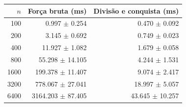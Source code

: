 \begin{tabular}{rrr}
\hline
$n$ & Força bruta (ms) & Divisão e conquista (ms) \\
\hline
100 & 0.997 $\pm$ 0.254 & 0.470 $\pm$ 0.092 \\
200 & 3.145 $\pm$ 0.692 & 0.749 $\pm$ 0.023 \\
400 & 11.927 $\pm$ 1.082 & 1.679 $\pm$ 0.058 \\
800 & 55.298 $\pm$ 14.105 & 4.244 $\pm$ 1.531 \\
1600 & 199.378 $\pm$ 11.407 & 9.074 $\pm$ 2.417 \\
3200 & 778.067 $\pm$ 27.041 & 18.997 $\pm$ 5.057 \\
6400 & 3164.203 $\pm$ 87.405 & 43.645 $\pm$ 10.257 \\
\hline
\end{tabular}
